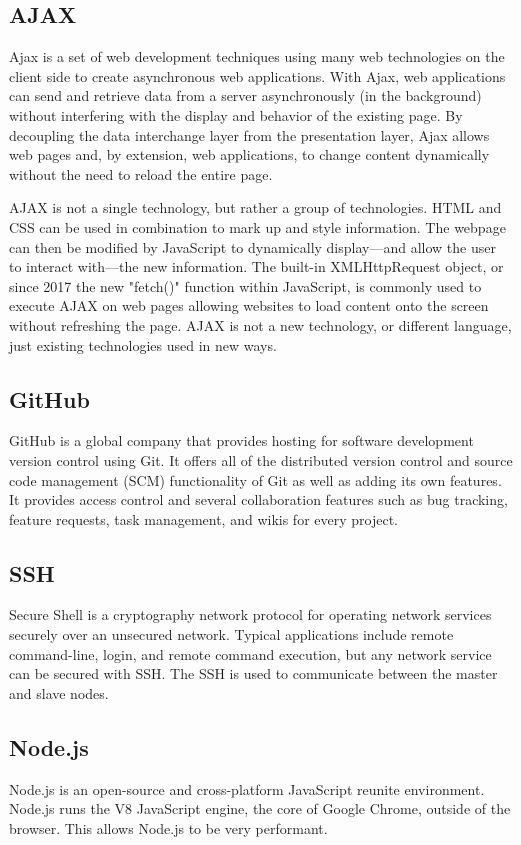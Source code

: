 \documentclass[12pt]{article}
\begin{document}
\subsection{AJAX}
Ajax is a set of web development techniques using many web technologies on the client side to create asynchronous web applications. With Ajax, web applications can send and retrieve data from a server asynchronously (in the background) without interfering with the display and behavior of the existing page. By decoupling the data interchange layer from the presentation layer, Ajax allows web pages and, by extension, web applications, to change content dynamically without the need to reload the entire page.\cite{ajax}

AJAX is not a single technology, but rather a group of technologies. HTML and CSS can be used in combination to mark up and style information. The webpage can then be modified by JavaScript to dynamically display—and allow the user to interact with—the new information. The built-in XMLHttpRequest object, or since 2017 the new "fetch()" function within JavaScript, is commonly used to execute AJAX on web pages allowing websites to load content onto the screen without refreshing the page. AJAX is not a new technology, or different language, just existing technologies used in new ways.

\subsection{GitHub}
GitHub is a global company that provides hosting for software development version control using Git. It offers all of the distributed version control and source code management (SCM) functionality of Git as well as adding its own features. It provides access control and several collaboration features such as bug tracking, feature requests, task management, and wikis for every project.\cite{git}

\subsection{SSH}
Secure Shell is a cryptography network protocol for operating network services securely over an unsecured network. Typical applications include remote command-line, login, and remote command execution, but any network service can be secured with SSH. The SSH is used to communicate between the master and slave nodes.\cite{ssh}

\subsection{Node.js}
Node.js is an open-source and cross-platform JavaScript reunite environment. Node.js runs the V8 JavaScript engine, the core of Google Chrome, outside of the browser. This allows Node.js to be very performant.
\end{document}
